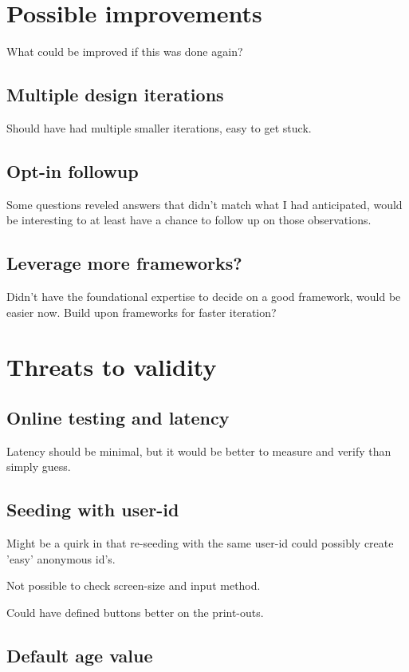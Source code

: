 \section{Possible improvements}

  What could be improved if this was done again?

  \subsection{Multiple design iterations}

    Should have had multiple smaller iterations, easy to get stuck.

  \subsection{Opt-in followup}

    Some questions reveled answers that didn't match what I had
    anticipated, would be interesting to at least have a chance to follow
    up on those observations.

  \subsection{Leverage more frameworks?}

    Didn't have the foundational expertise to decide on a good
    framework, would be easier now.
    Build upon frameworks for faster iteration?

\section{Threats to validity}

  \subsection{Online testing and latency}

  Latency should be minimal, but it would be better to measure and
  verify than simply guess.

  \subsection{Seeding with user-id}

  Might be a quirk in that re-seeding with the same user-id could
  possibly create 'easy' anonymous id's.

  Not possible to check screen-size and input method.

  Could have defined buttons better on the print-outs.

  \subsection{Default age value}\label{label_validity_default_age}

